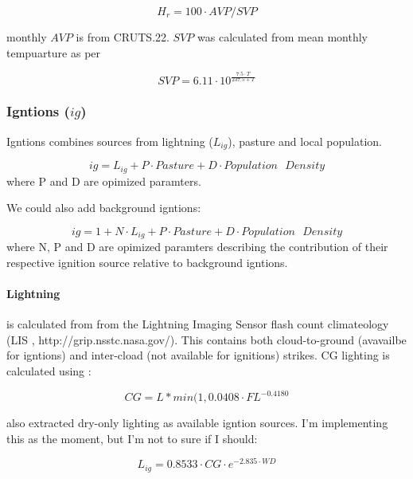 \begin{equation}
    H_r = 100 \cdot AVP / SVP
\end{equation}

monthly $AVP$ is from CRUTS.22. $SVP$ was calculated from mean monthly tempuarture as per \citet{walter2000asce}

\begin{equation}
    SVP = 6.11 \cdot 10^{\frac{7.5 \cdot T}{237.5 + T}}
\end{equation}

\subsubsection{Igntions ($ig$)}

Igntions combines sources from lightning ($L_{ig}$), pasture and local population.

\begin{equation}
    ig = L_{ig} + P \cdot Pasture + D \cdot Population\text{ }Density
\end{equation}
where P and D are opimized paramters.

\begin{shaded}
    We could also add background igntions:

    \begin{equation}
        ig = 1 + N \cdot L_{ig} + P \cdot Pasture + D \cdot Population\text{ }Density
    \end{equation}
    where N, P and D are opimized paramters describing the contribution of their respective ignition source relative to background igntions.
\end{shaded}

\paragraph{Lightning}
is calculated from
from the Lightning Imaging Sensor flash count climateology (LIS \cite{christian1999lightning}, http://grip.nsstc.nasa.gov/). 
This contains both cloud-to-ground (avavailbe for igntions) and inter-cload (not available for ignitions) strikes.
CG lighting is calculated using \citet{kelley2014improved}:

\begin{equation}
    CG = L * min(1, 0.0408 \cdot FL^{-0.4180}
\end{equation}

\begin{shaded}
\citet{kelley2014improved} also extracted dry-only lighting as available igntion sources. I'm implementing this as the moment, but I'm not to sure if I should:

\begin{equation}
    L_{ig} = 0.8533 \cdot CG \cdot e^{-2.835 \cdot WD}
\end{equation}
\end{shaded}

